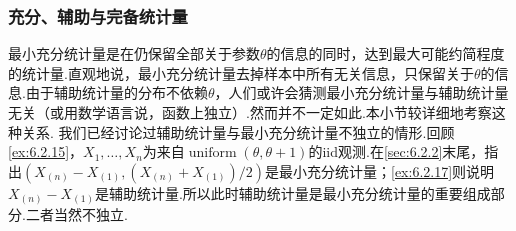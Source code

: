 \subsubsection{充分、辅助与完备统计量}\label{sec:6.2.4}
最小充分统计量是在仍保留全部关于参数$\theta$的信息的同时，达到最大可能约简程度的统计量.直观地说，最小充分统计量去掉样本中所有无关信息，只保留关于$\theta$的信息.由于辅助统计量的分布不依赖$\theta$，人们或许会猜测最小充分统计量与辅助统计量无关（或用数学语言说，函数上独立）.然而并不一定如此.本小节较详细地考察这种关系.
我们已经讨论过辅助统计量与最小充分统计量不独立的情形.回顾\autoref{ex:6.2.15}，$X_1,\ldots,X_n$为来自$\operatorname{uniform}(\theta,\theta+1)$的iid观测.在\autoref{sec:6.2.2}末尾，指出$(X_{(n)}-X_{(1)},(X_{(n)}+X_{(1)})/2)$是最小充分统计量；\autoref{ex:6.2.17}则说明$X_{(n)}-X_{(1)}$是辅助统计量.所以此时辅助统计量是最小充分统计量的重要组成部分.二者当然不独立.

